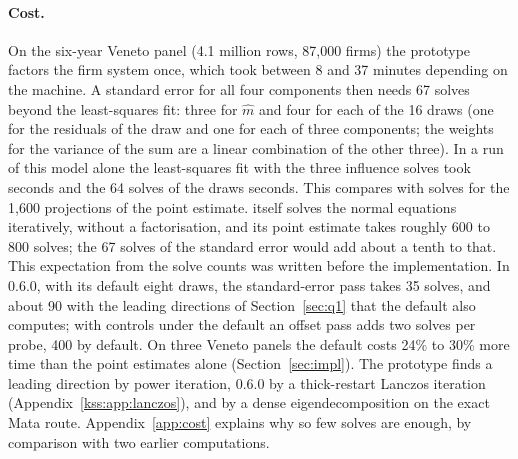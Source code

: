 \paragraph{Cost.} On the six-year Veneto panel (4.1 million rows, 87{,}000 firms) the prototype factors the
firm system once, which took between 8 and 37 minutes depending on the machine. A standard error for all four
components then needs 67 solves beyond the least-squares fit: three for $\hat m$ and four for each of the 16
draws (one for the residuals of the draw and one for each of three components; the weights for the variance of
the sum are a linear combination of the other three). In a run of this model alone the least-squares fit with the three influence solves took
 seconds and the 64 solves of the draws  seconds. This compares with
 solves for the 1{,}600 projections of the point estimate. \fevc{} itself solves the
normal equations iteratively, without a factorisation, and its point estimate takes roughly 600 to 800 solves;
the 67 solves of the standard error would add about a tenth to that. This expectation from the solve counts was
written before the implementation. In \fevc{} 0.6.0, with its default eight draws, the standard-error pass takes
35 solves, and about 90 with the leading directions of Section~\ref{sec:q1} that the default also computes; with
controls under the default  an offset pass adds two solves per probe, 400 by default. On
three Veneto panels the default costs 24\% to 30\% more time than the point estimates alone
(Section~\ref{sec:impl}). The prototype finds a leading direction by power iteration, \fevc{} 0.6.0 by a
thick-restart Lanczos iteration (Appendix~\ref{kss:app:lanczos}), and by a dense eigendecomposition on the exact
Mata route. Appendix~\ref{app:cost} explains why so few
solves are enough, by comparison with two earlier computations.
